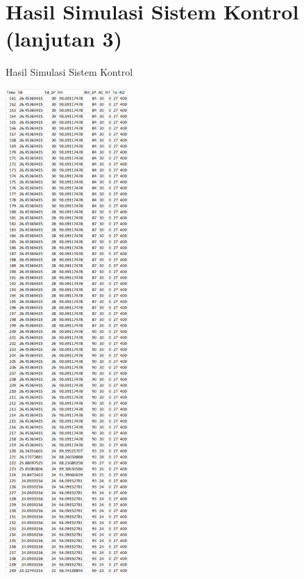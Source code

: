 \section{Hasil Simulasi Sistem Kontrol (lanjutan 3)}
\begin{table}[!h]
	\caption{Hasil Simulasi Sistem Kontrol}
	\label{tbl:A:HasilSimulasiKontrol3}
	\centering
	\includegraphics[width=0.35\textwidth]{figures/HasilSimulasiSimulink3}
\end{table}
\break

